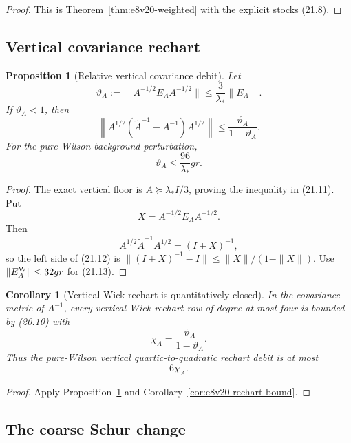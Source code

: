 \documentclass[11pt,oneside]{book}
\newtheorem{proposition}[theorem]{Proposition}
\newtheorem{corollary}[theorem]{Corollary}
\theoremstyle{definition}
\theoremstyle{remark}
\begin{document}
\begin{proof}
This is Theorem~\ref{thm:e8v20-weighted} with the explicit stocks
(21.8).
\end{proof}

\subsection{Vertical covariance rechart}

\begin{proposition}[Relative vertical covariance debit]
\label{prop:e8v21-vertical-covariance}
Let
\[
\vartheta_A:=
\|A^{-1/2}E_AA^{-1/2}\|
\leq\frac3{\lambda_*}\|E_A\|.                     \tag{21.11}
\]
If \(\vartheta_A<1\), then
\[
\boxed{\quad
\left\|
A^{1/2}(\widetilde A^{-1}-A^{-1})A^{1/2}
\right\|
\leq\frac{\vartheta_A}{1-\vartheta_A}.
\quad}                                             \tag{21.12}
\]
For the pure Wilson background perturbation,
\[
\vartheta_A\leq\frac{96}{\lambda_*}gr.             \tag{21.13}
\]
\end{proposition}

\begin{proof}
The exact vertical floor is \(A\succeq\lambda_*I/3\), proving the
inequality in (21.11).  Put
\[
 X=A^{-1/2}E_AA^{-1/2}.
\]
Then
\[
 A^{1/2}\widetilde A^{-1}A^{1/2}=(I+X)^{-1},
\]
so the left side of (21.12) is
\(\|(I+X)^{-1}-I\|\leq\|X\|/(1-\|X\|)\).
Use \(\|E_A^{\rm W}\|\leq32gr\) for (21.13).
\end{proof}

\begin{corollary}[Vertical Wick rechart is quantitatively closed]
\label{cor:e8v21-vertical-wick}
In the covariance metric of \(A^{-1}\), every vertical Wick rechart
row of degree at most four is bounded by (20.10) with
\[
                    \chi_A=\frac{\vartheta_A}{1-\vartheta_A}.      \tag{21.14}
\]
Thus the pure-Wilson vertical quartic-to-quadratic rechart debit is at
most
\[
                         6\chi_A.                                 \tag{21.15}
\]
\end{corollary}

\begin{proof}
Apply Proposition~\ref{prop:e8v21-vertical-covariance} and
Corollary~\ref{cor:e8v20-rechart-bound}.
\end{proof}

\subsection{The coarse Schur change}
\end{document}
